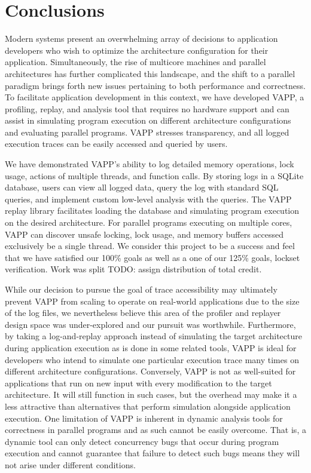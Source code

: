\section{Conclusions}
Modern systems present an overwhelming array of decisions to
application developers who wish to optimize the architecture 
configuration for their application.  Simultaneously, the
rise of multicore machines and parallel architectures has
further complicated this landscape, and the shift to a parallel
paradigm brings forth new issues pertaining to both performance
and correctness.  To facilitate application development in this
context, we have developed VAPP, a profiling, replay, and analysis tool that 
requires no hardware support and can assist in simulating
program execution on different architecture configurations and
evaluating parallel programs.  VAPP stresses transparency, and
all logged execution traces can be easily accessed and queried
by users.

We have demonstrated VAPP's ability to log detailed memory operations,
lock usage, actions of multiple threads, and function calls.  By
storing logs in a SQLite database, users can view all logged data,
query the log with standard SQL queries, and implement custom
low-level analysis with the queries.  The VAPP replay library
facilitates loading the database and simulating program execution
on the desired architecture.  For parallel programs executing on multiple
cores, VAPP can discover unsafe locking, lock usage, and memory
buffers accessed exclusively be a single thread.  We consider this
project to be a success and feel that we have satisfied our 100\%
goals as well as a one of our 125\% goals, lockset verification.
Work was split TODO: assign distribution of total credit.

While our decision to pursue the goal of trace accessibility may
ultimately prevent VAPP from scaling to operate on real-world
applications due to the size of the log files, we nevertheless
believe this area of the profiler and replayer
design space was under-explored and our pursuit was worthwhile.
Furthermore, by taking a log-and-replay approach instead of
simulating the target architecture during application execution
as is done in some related tools, VAPP is ideal for developers
who intend to simulate one particular execution trace many
times on different architecture configurations.  Conversely,
VAPP is not as well-suited for applications that run on new
input with every modification to the target architecture.  It will
still function in such cases, but the overhead may make it a less
attractive than alternatives that perform simulation alongside
application execution.  One limitation of VAPP is inherent in
dynamic analysis tools for correctness in parallel programs and
as such cannot be easily overcome.  That is, a dynamic tool
can only detect concurrency bugs that occur during program
execution and cannot guarantee that failure to detect such
bugs means they will not arise under different conditions.

